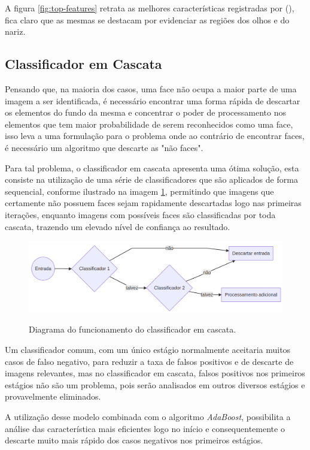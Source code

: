  A figura \ref{fig:top-features} retrata as melhores características registradas por  (\citeyear{paper-viola-jones}), fica claro que as mesmas se destacam por evidenciar as regiões dos olhos e do nariz.

\subsection{Classificador em Cascata}

Pensando que, na maioria dos casos, uma face não ocupa a maior parte de uma imagem a ser identificada, é necessário encontrar uma forma rápida de descartar os elementos do fundo da mesma e concentrar o poder de processamento nos elementos que tem maior probabilidade de serem reconhecidos como uma face, isso leva a uma formulação para o problema onde ao contrário de encontrar faces, é necessário um algoritmo que descarte as "não faces".

Para tal problema, o classificador em cascata apresenta uma ótima solução, esta consiste na utilização de uma série de classificadores que são aplicados de forma sequencial, conforme ilustrado na imagem \ref{fig:cascade-classifier}, permitindo que imagens que certamente não possuem faces sejam rapidamente descartadas logo nas primeiras iterações, enquanto imagens com possíveis faces são classificadas por toda cascata, trazendo um elevado nível de confiança ao resultado.

\begin{figure}[htb]
    \centering
    \caption{Diagrama do funcionamento do classificador em cascata.}
    \includegraphics[scale=.3]{figs/cascade-classifier.png}
    \label{fig:cascade-classifier}
 \end{figure}

 Um classificador comum, com um único estágio normalmente aceitaria muitos casos de falso negativo, para reduzir a taxa de falsos positivos e de descarte de imagens relevantes, mas no classificador em cascata, falsos positivos nos primeiros estágios não são um problema, pois serão analisados em outros diversos estágios e provavelmente eliminados.

 A utilização desse modelo combinada com o algoritmo \textit{AdaBoost}, possibilita a análise das característica mais eficientes logo no início e consequentemente o descarte muito mais rápido dos casos negativos nos primeiros estágios.
